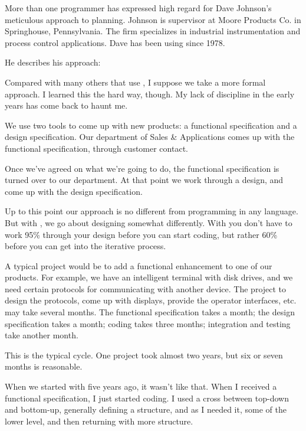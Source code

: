 \begin{interview}
\noindent More than one \Forth{} programmer has expressed high regard for
Dave Johnson's meticulous approach to planning. Johnson is supervisor at
Moore Products Co. in Springhouse, Pennsylvania. The firm specializes
in industrial instrumentation and process control applications. Dave has
been using \Forth{} since 1978.

He describes his approach:
\begin{tfquot}
Compared with many others that use \Forth{}, I suppose we take a more
formal approach. I learned this the hard way, though. My lack of
discipline in the early years has come back to haunt me.

We use two tools to come up with new products: a functional specification
and a design specification. Our department of Sales \& Applications comes
up with the functional specification, through customer contact.

Once we've agreed on what we're going to do, the functional
specification is turned over to our department. At that point we work
through a design, and come up with the design specification.

Up to this point our approach is no different from programming in any
language. But with \Forth{}, we go about designing somewhat
differently.  With \Forth{} you don't have to work 95\% through your
design before you can start coding, but rather 60\% before you can get
into the iterative process.


A typical project would be to add a functional enhancement to one of
our products. For example, we have an intelligent terminal with disk
drives, and we need certain protocols for communicating with another
device. The project to design the protocols, come up with displays,
provide the operator interfaces, etc. may take several months. The
functional specification takes a month; the design specification takes
a month; coding takes three months; integration and testing take
another month.

This is the typical cycle. One project took almost two years, but six
or seven months is reasonable.

When we started with \Forth{} five years ago, it wasn't like that. When I
received a functional specification, I just started coding. I used a
cross between top-down and bottom-up, generally defining a structure,
and as I needed it, some of the lower level, and then returning with
more structure.


\end{tfquot}
\end{interview}
